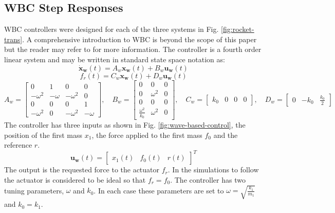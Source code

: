 \documentclass{mbd_fullpaper}
\begin{document}
\subsection{WBC Step Responses}
WBC controllers were designed for each of the three systems in Fig. \ref{fig:rocket-trans}.
A comprehensive introduction to WBC is beyond the scope of this paper but the reader may refer to \cite{OConnor1998} for more information.
The controller is a fourth order linear system and may be written in standard state space notation as:
\begin{equation}
\mathbf{\dot{x}_w}(t) = A_w \mathbf{x_w}(t) + B_w \mathbf{u_w}(t)
\end{equation}
\begin{equation}
f_r(t) = C_w \mathbf{x_w}(t) + D_w \mathbf{u_w}(t)
\end{equation}
\begin{equation}
A_w = \begin{bmatrix} 0 & 1 & 0 & 0 \\
-\omega^2 & -\omega & -\omega^2 & 0 \\
0 & 0 & 0 & 1 \\
-\omega^2 & 0 & -\omega^2 & -\omega \end{bmatrix}
, \quad
B_w = \begin{bmatrix} 0 & 0 & 0 \\
0 & \omega^2 & 0 \\
0 & 0 & 0 \\
\frac{\omega^2}{k_0} & \omega^2 & 0 \end{bmatrix}
,\quad
C_w = \begin{bmatrix} k_0 & 0 & 0 & 0 \end{bmatrix}
,\quad
D_w = \begin{bmatrix} 0 & -k_0 & \frac{k_0}{2} \end{bmatrix}
\end{equation}
The controller has three inputs as shown in Fig. \ref{fig:wave-based-control}, the position of the first mass $x_1$, the force applied to the first mass $f_0$ and the reference $r$.
\begin{equation}
\mathbf{u_w}(t) = \begin{bmatrix} x_1(t) &  f_0(t) & r(t) \end{bmatrix}^T
\end{equation}
The output is the requested force to the actuator $f_r$.
In the simulations to follow the actuator is considered to be ideal so that $f_r = f_0$.
The controller has two tuning parameters, $\omega$ and $k_0$.
In each case these parameters are set to $\omega = \sqrt{\frac{k_1}{m_1}}$ and $k_0 = k_1$.
\end{document}
